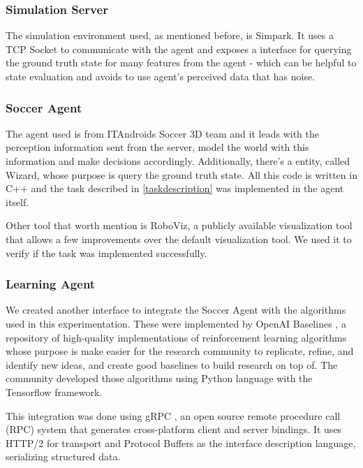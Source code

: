 \subsubsection{Simulation Server}

The simulation environment used, as mentioned before, is Simpark. It uses a TCP Socket to communicate with the agent and exposes a interface for querying the ground truth state for many features from the agent - which can be helpful to state evaluation and avoids to use agent's perceived data that has noise. 

\subsubsection{Soccer Agent}
The agent used is from ITAndroids Soccer 3D team and it leads with the perception information sent from the server, model the world with this information and make decisions accordingly. Additionally, there's a entity, called Wizard, whose purpose is query the ground truth state. All this code is written in C++ and the task described in \ref{taskdescription} was implemented in the agent itself.

Other tool that worth mention is RoboViz, a publicly available visualization tool that allows a few improvements over the default visualization tool. We used it to verify if the task was implemented successfully.

\subsubsection{Learning Agent}\label{learningagent}

We created another interface to integrate the Soccer Agent with the algorithms used in this experimentation. These were implemented by OpenAI Baselines \cite{baselines}, a repository of high-quality implementations of reinforcement learning algorithms whose purpose is make easier for the research community to replicate, refine, and identify new ideas, and create good baselines to build research on top of. The community developed those algorithms using Python language with the Tensorflow \cite{tensorflow2015-whitepaper} framework.

This integration was done using gRPC \cite{grpc}, an open source remote procedure call (RPC) system that generates cross-platform client and server bindings. It uses HTTP/2 for transport and Protocol Buffers \cite{protocolbuffers} as the interface description language, serializing structured data.





